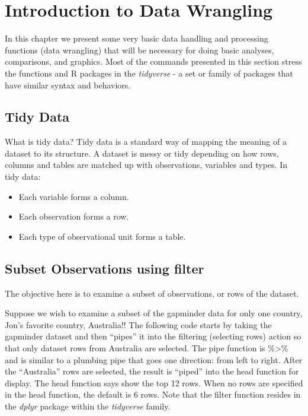 \documentclass[
]{book}
\begin{document}
\hypertarget{IntroDataWrangling}{%
\chapter{Introduction to Data Wrangling}\label{IntroDataWrangling}}

In this chapter we present some very basic data handling and processing functions (data wrangling) that will be necessary for doing basic analyses, comparisons, and graphics. Most of the commands presented in this section stress the functions and R packages in the \emph{tidyverse} - a set or family of packages that have similar syntax and behaviors.

\hypertarget{tidy-data}{%
\section{Tidy Data}\label{tidy-data}}

What is tidy data? Tidy data is a standard way of mapping the meaning of a dataset to its structure. A dataset is messy or tidy depending on how rows, columns and tables are matched up with observations, variables and types. In tidy data:

\begin{itemize}
\item
  Each variable forms a column.
\item
  Each observation forms a row.
\item
  Each type of observational unit forms a table.
\end{itemize}

\hypertarget{subset-observations-using-filter}{%
\section{Subset Observations using filter}\label{subset-observations-using-filter}}

The objective here is to examine a subset of observations, or rows of the dataset.

Suppose we wish to examine a subset of the gapminder data for only one country, Jon's favorite country, Australia!! The following code starts by taking the gapminder dataset and then ``pipes'' it into the filtering (selecting rows) action so that only dataset rows from Australia are selected. The pipe function is \%\textgreater\% and is similar to a plumbing pipe that goes one direction: from left to right. After the ``Australia'' rows are selected, the result is ``piped'' into the head function for display. The head function says show the top 12 rows. When no rows are specified in the head function, the default is 6 rows. Note that the filter function resides in the \emph{dplyr} package within the \emph{tidyverse} family.
\end{document}
